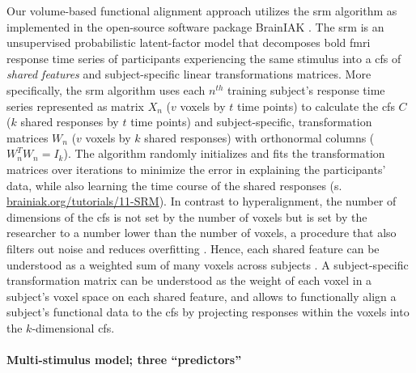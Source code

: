 Our volume-based functional alignment approach utilizes the \ac{srm} algorithm
\citep{chen2015reduced, richard2019fast} as implemented in the open-source
software package BrainIAK \citep[Brain Imaging Analysis Kit;
\href{https://brainiak.org}{\url{brainiak.org}};][]{kumar2020brainiak,
kumar2020brainiaktutorial}.
The \ac{srm} is an unsupervised probabilistic latent-factor model that
decomposes \ac{bold} \ac{fmri} response time series of participants experiencing
the same stimulus into a \ac{cfs} of \textit{shared features} \citep[also called
``\textit{shared feature space}'';][]{chen2015reduced} and subject-specific
linear transformations matrices.
More specifically, the \ac{srm} algorithm uses each $n^{th}$ training subject's
response time series represented as matrix $X_{n}$ ({$v$} voxels by $t$ time
points) to calculate the \ac{cfs} $C$ ($k$ shared responses by $t$ time points)
and subject-specific, transformation matrices $W_{n}$ ($v$ voxels by $k$ shared
responses) with orthonormal columns ($W_{n}^{T}W_{n}=I_{k}$).
The algorithm randomly initializes and fits the transformation matrices over
iterations to minimize the error in explaining the participants' data, while
also learning the time course of the shared responses (s.
\href{https://brainiak.org/tutorials/11-SRM/}{\url{brainiak.org/tutorials/11-SRM}}).
In contrast to hyperalignment, the number of dimensions of the \ac{cfs} is not
set by the number of voxels but is set by the researcher to a number lower than
the number of voxels, a procedure that also filters out noise and reduces
overfitting \citep{chen2015reduced}.
Hence, each shared feature can be understood as a weighted sum of many voxels
across subjects \citep{kumar2020brainiak}.
A subject-specific transformation matrix can be understood as the weight of each
voxel in a subject's voxel space on each shared feature, and allows to
functionally align a subject's functional data to the \ac{cfs} by projecting
responses within the voxels into the $k$-dimensional \ac{cfs}.


\paragraph{Multi-stimulus model; three ``predictors''}


